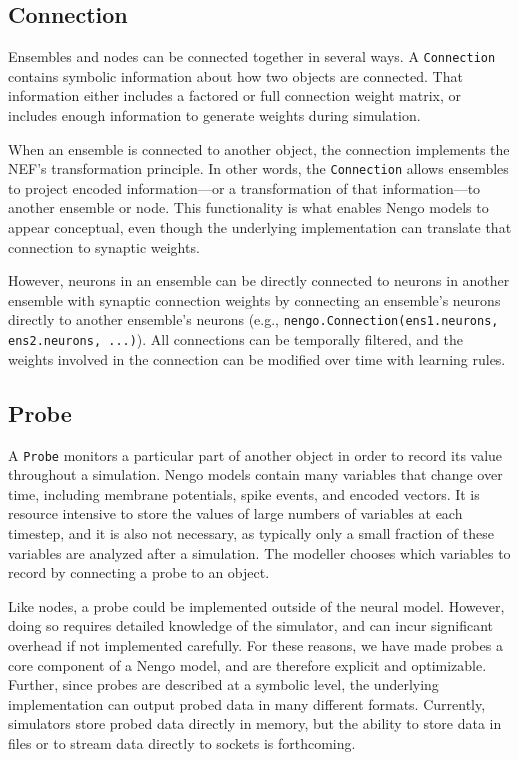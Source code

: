 \documentclass{frontiersSCNS}
\begin{document}
\subsection{Connection} \label{sec:connection}

Ensembles and nodes can be connected together
in several ways.
A \texttt{Connection} contains symbolic information
about how two objects are connected.
That information either includes
a factored or full connection weight matrix,
or includes enough information
to generate weights during simulation.

When an ensemble is connected
to another object,
the connection implements
the NEF's transformation principle.
In other words, the \texttt{Connection}
allows ensembles to project
encoded information---or
a transformation of that information---to
another ensemble or node.
This functionality is what enables Nengo models
to appear conceptual,
even though the underlying implementation
can translate that connection
to synaptic weights.

However, neurons in an ensemble can be directly connected
to neurons in another ensemble
with synaptic connection weights
by connecting an ensemble's
neurons directly to another ensemble's neurons
(e.g., \texttt{nengo.Connection(ens1.neurons, ens2.neurons, ...)}).
All connections can be temporally filtered,
and the weights involved in the connection
can be modified over time with learning rules.

\subsection{Probe}

A \texttt{Probe} monitors
a particular part of another object
in order to record its value throughout a simulation.
Nengo models contain many variables
that change over time,
including membrane potentials,
spike events, and encoded vectors.
It is resource intensive to store the values of
large numbers of variables
at each timestep, and it is also not necessary,
as typically only a small fraction
of these variables are analyzed after a simulation.
The modeller chooses which variables to
record by connecting a probe to an object.

Like nodes, a probe could be implemented
outside of the neural model.
However, doing so requires detailed knowledge
of the simulator,
and can incur significant overhead
if not implemented carefully.
For these reasons, we have made probes
a core component of a Nengo model,
and are therefore explicit
and optimizable.
Further, since probes are described
at a symbolic level,
the underlying implementation
can output probed data in many different formats.
Currently, simulators store probed data
directly in memory,
but the ability to store data
in files or to stream data
directly to sockets is forthcoming.
\end{document}
